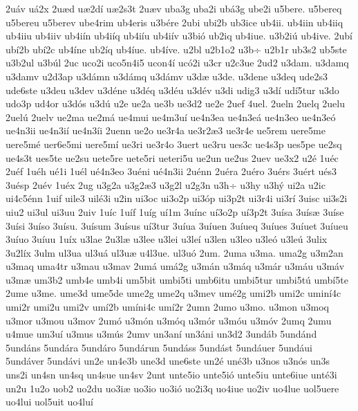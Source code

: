 {2u^^e1v
u^^e12x
2u^^e6d
u^^e62d^^ed
u^^e62s3t
2u^^e6v
uba3g
uba2i
ub^^e13g
ube2i
u5bere.
u5bereq
u5bereu
u5berev
ube4rim
ub4eris
u3b^^e9re
2ubi
ubi2b
ub3ice
ub4ii.
ub4iin
ub4iiq
ub4iiu
ub4iiv
ub4i^^edn
ub4i^^edq
ub4i^^edu
ub4i^^edv
u3bi^^f3
ub2iq
ub4iue.
u3b2i^^fa
ub4ive.
2ub^^ed
ub^^ed2b
ub^^ed2c
ub4^^edne
ub2^^edq
ub4^^edue.
ub4^^edve.
u2bl
u2b1o2
u3b^^f7
u2b1r
ub3s2
ub5ste
u3b2ul
u3b^^fal
2uc
uco2i
uco5n4i5
ucon4^^ed
uc^^f32i
u3cr
u2c3ue
2ud2
u3dam.
u3damq
u3damv
u2d3ap
u3d^^e1mn
u3d^^e1mq
u3d^^e1mv
u3d^^e6
u3de.
u3dene
u3deq
ude2s3
ude6ste
u3deu
u3dev
u3d^^e9ne
u3d^^e9q
u3d^^e9u
u3d^^e9v
u3di
udig3
u3d^^ed
ud^^ed5tur
u3do
udo3p
ud4or
u3d^^f3s
u3d^^fa
u2e
ue2a
ue3b
ue3d2
ue2e
2uef
4uel.
2ueln
2uelq
2uelu
2uel^^fa
2uelv
ue2ma
ue2m^^e1
ue4mui
ue4m3u^^ed
ue4n3ea
ue4n3e^^e1
ue4n3eo
ue4n3e^^f3
ue4n3ii
ue4n3i^^ed
ue4n3^^edi
2uenn
ue2o
ue3r4a
ue3r2^^e63
ue3r4e
ue5rem
uere5me
uere5m^^e9
uer6e5mi
uere5m^^ed
ue3ri
ue3r4o
3uert
ue3ru
ues3c
ue4s3p
ues5pe
ue2sq
ue4s3t
ues5te
ue2su
uete5re
uete5ri
ueteri5u
ue2un
ue2us
2uev
ue3x2
u2^^e9
1u^^e9c
2u^^e9f
1u^^e9h
u^^e91i
1u^^e9l
u^^e94n3eo
3u^^e9ni
u^^e94n3ii
2u^^e9nn
2u^^e9ra
2u^^e9ro
3u^^e9rs
3u^^e9rt
u^^e9s3
3u^^e9sp
2u^^e9v
1u^^e9x
2ug
u3g2a
u3g2^^e63
u3g2l
u2g3n
u3h^^f7
u3hy
u3h^^fd
ui2a
u2ic
ui4c5^^e9nn
1uif
uile3
uil^^e93i
u2in
ui3oc
ui3o2p
ui3^^f3p
ui3p2t
ui3r4i
ui3r^^ed
3uisc
ui3s2i
uiu2
ui3ul
ui3uu
2uiv
1u^^edc
1u^^edf
1u^^edg
u^^ed1m
3u^^ednc
u^^ed3o2p
u^^ed3p2t
3u^^edsa
3u^^eds^^e6
3u^^edse
3u^^edsi
3u^^edso
3u^^edsu.
3u^^edsum
3u^^edsus
u^^ed3tur
3u^^edua
3u^^eduen
3u^^edueq
3u^^edues
3u^^eduet
3u^^edueu
3u^^eduo
3u^^eduu
1u^^edx
u3lae
2u3l^^e6
u3lee
u3lei
u3le^^ed
u3len
u3leo
u3le^^f3
u3le^^fa
3ulix
3u2l^^edx
3ulm
ul3ua
ul3u^^e1
ul3u^^e6
u4l3ue.
ul3u^^f3
2um.
2uma
u3ma.
uma2g
u3m2an
u3maq
uma4tr
u3mau
u3mav
2um^^e1
um^^e12g
u3m^^e1n
u3m^^e1q
u3m^^e1r
u3m^^e1u
u3m^^e1v
u3m^^e6
um3b2
umb4e
umb4i
um5bit
umbi5ti
umb6itu
umbi5tur
umbi5t^^fa
umb^^ed5te
2ume
u3me.
ume3d
ume5de
ume2g
ume2q
u3mev
um^^e92g
umi2b
umi2c
umin^^ed4c
umi2r
umi2u
umi2v
um^^ed2b
um^^edni4c
um^^ed2r
2umn
2umo
u3mo.
u3mon
u3moq
u3mor
u3mou
u3mov
2um^^f3
u3m^^f3n
u3m^^f3q
u3m^^f3r
u3m^^f3u
u3m^^f3v
2umq
2umu
u4mue
um3u^^ed
u3mus
u3m^^fas
2umv
un3an^^ed
un3^^e1ni
un3d2
3und^^e1b
5und^^e1nd
5und^^e1ns
5und^^e1ra
5und^^e1ro
5und^^e1run
5und^^e1ss
5und^^e1st
5und^^e1uer
5und^^e1ui
5und^^e1ver
5und^^e1vi
un2e
un4e3b
une3d
une6ste
un2^^e9
un^^e93b
u3nos
u3n^^f3s
un3s
uns2i
un4sn
un4sq
un4sue
un4sv
2unt
unte5io
unte5i^^f3
unte5iu
unte6iue
unt^^e93i
un2u
1u2o
uob2
uo2du
uo3i^^e6
uo3io
uo3i^^f3
uo2i3q
uo4iue
uo2iv
uo4lue
uol5uere
uo4lui
uol5uit
uo4lu^^ed
}
